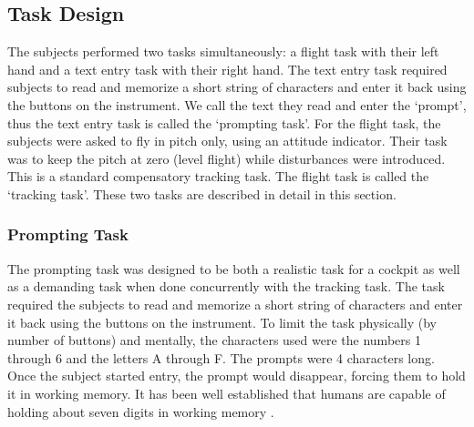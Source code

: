 \subsection{Task Design}



%

The subjects performed two tasks simultaneously: a flight task with their left hand and a text entry task with their right hand.
The text entry task required subjects to read and memorize a short string of characters and enter it back using the buttons on the instrument.
We call the text they read and enter the `prompt', thus the text entry task is called the `prompting task'.
For the flight task, the subjects were asked to fly in pitch only, using an attitude indicator.
Their task was to keep the pitch at zero (level flight) while disturbances were introduced.
This is a standard compensatory tracking task.
The flight task is called the `tracking task'.
These two tasks are described in detail in this section.

\subsubsection{Prompting Task}

The prompting task was designed to be both a realistic task for a cockpit as well as a demanding task when done concurrently with the tracking task.
The task required the subjects to read and memorize a short string of characters and enter it back using the buttons on the instrument.
To limit the task physically (by number of buttons) and mentally, the characters used were the numbers 1 through 6 and the letters A through F.
The prompts were 4 characters long.
Once the subject started entry, the prompt would disappear, forcing them to hold it in working memory.
It has been well established that humans are capable of holding about seven digits in working memory \citep{miller_magical_1956,baddeley_working_1992}.

